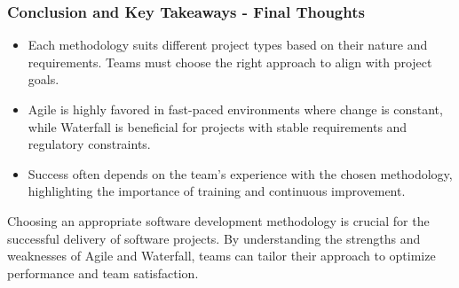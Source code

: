 \documentclass{beamer}
\begin{document}
\begin{frame}[fragile]
    \frametitle{Conclusion and Key Takeaways - Final Thoughts}
    \begin{itemize}
        \item Each methodology suits different project types based on their nature and requirements. Teams must choose the right approach to align with project goals.
        \item Agile is highly favored in fast-paced environments where change is constant, while Waterfall is beneficial for projects with stable requirements and regulatory constraints.
        \item Success often depends on the team's experience with the chosen methodology, highlighting the importance of training and continuous improvement.
    \end{itemize}
    
    Choosing an appropriate software development methodology is crucial for the successful delivery of software projects. By understanding the strengths and weaknesses of Agile and Waterfall, teams can tailor their approach to optimize performance and team satisfaction. 
\end{frame}
\end{document}
